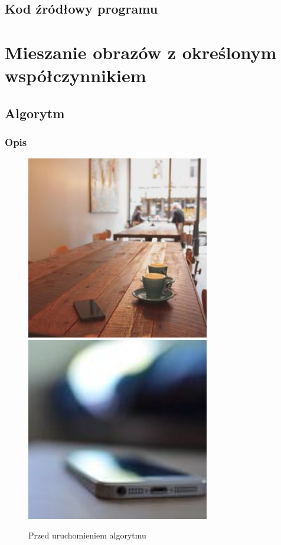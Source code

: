 \documentclass[a4paper,12pt]{book}
\begin{document}
\subsection*{Kod źródłowy programu}

\section{Mieszanie obrazów z określonym współczynnikiem}
\subsection*{Algorytm}
\subsubsection*{Opis}
\begin{figure}[H]
	\caption{Przed uruchomieniem algorytmu}
	\includegraphics[width=8cm, height=8cm]{coffee-unmodified.jpg}
	\includegraphics[width=8cm, height=8cm]{phone-unmodified.jpg}
\end{figure}
\end{document}
